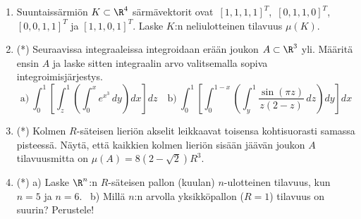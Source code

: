 \begin{enumerate}
\item
Suuntaissärmiön $K\subset\R^4$ särmävektorit ovat $\,[1,1,1,1]^T$, $\,[0,1,1,0]^T$, \newline
$[0,0,1,1]^T$ ja $[1,1,0,1]^T$. Laske $K$:n neliulotteinen tilavuus $\mu(K)$.

\item (*)
Seuraavissa integraaleissa integroidaan erään joukon $A\subset\R^3$ yli. Määritä ensin $A$ ja
laske sitten integraalin arvo valitsemalla sopiva integroimisjärjestys.
\[
\text{a)}\ \int_0^1\left[\int_z^1\left(\int_0^x e^{x^3}\,dy\right)dx\right]dz \quad
\text{b)}\ \int_0^1\left[\int_0^{1-x}\left(\int_y^1 
                                   \frac{\sin(\pi z)}{z(2-z)}\,dz\right)dy\right]dx
\]

\item (*)
Kolmen $R$-säteisen lieriön akselit leikkaavat toisensa kohtisuorasti samassa pisteessä.
Näytä, että kaikkien kolmen lieriön sisään jäävän joukon $A$ tilavuusmitta on
$\mu(A)=8(2-\sqrt{2})R^3$.

\item (*) 
a) Laske $\R^n$:n $R$-säteisen pallon (kuulan) $n$-ulotteinen tilavuus, kun $n=5$ ja $n=6$. \
b) Millä $n$:n arvolla yksikköpallon ($R=1$) tilavuus on suurin? Perustele!

\end{enumerate}